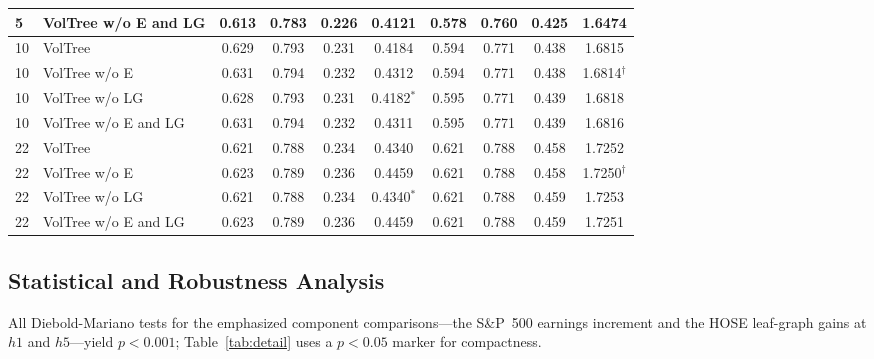 \documentclass[runningheads,a4paper]{llncs}
\begin{document}
\begin{table}[!t]
\begin{tabular}{ll cccc cccc}
5 & VolTree w/o E and LG & 0.613 & 0.783 & 0.226 & 0.4121 & 0.578 & 0.760 & 0.425 & 1.6474 \\
\midrule
10 & VolTree              & 0.629 & 0.793 & 0.231 & 0.4184 & 0.594 & 0.771 & 0.438 & 1.6815 \\
10 & VolTree w/o E        & 0.631 & 0.794 & 0.232 & 0.4312 & 0.594 & 0.771 & 0.438 & 1.6814$^{\dagger}$ \\
10 & VolTree w/o LG       & 0.628 & 0.793 & 0.231 & 0.4182$^{*}$ & 0.595 & 0.771 & 0.439 & 1.6818 \\
10 & VolTree w/o E and LG & 0.631 & 0.794 & 0.232 & 0.4311 & 0.595 & 0.771 & 0.439 & 1.6816 \\
\midrule
22 & VolTree              & 0.621 & 0.788 & 0.234 & 0.4340 & 0.621 & 0.788 & 0.458 & 1.7252 \\
22 & VolTree w/o E        & 0.623 & 0.789 & 0.236 & 0.4459 & 0.621 & 0.788 & 0.458 & 1.7250$^{\dagger}$ \\
22 & VolTree w/o LG       & 0.621 & 0.788 & 0.234 & 0.4340$^{*}$ & 0.621 & 0.788 & 0.459 & 1.7253 \\
22 & VolTree w/o E and LG & 0.623 & 0.789 & 0.236 & 0.4459 & 0.621 & 0.788 & 0.459 & 1.7251 \\
\bottomrule
\end{tabular}
\end{table}

\subsection{Statistical and Robustness Analysis}\label{sec:robust}
All Diebold-Mariano tests for the emphasized component comparisons---the S\&P~500 earnings increment and
the HOSE leaf-graph gains at $h1$ and $h5$---yield $p<0.001$; Table~\ref{tab:detail} uses a $p<0.05$ marker
for compactness.
\end{document}
